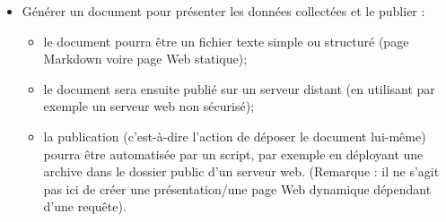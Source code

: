 {\begin{itemize}
\begin{itemize}
  \item
    extraire des statistiques (moyennes, histogrammes);
  \item
    produire des représentations ``graphiques'' (nuage de mots, tableaux
    comparatifs);
  \end{itemize}
\item
  Générer un document pour présenter les données collectées et le
  publier :
  \begin{itemize}
  \item
    le document pourra être un fichier texte simple ou structuré (page
    Markdown voire page Web statique);
  \item
    le document sera ensuite publié sur un serveur distant (en utilisant
    par exemple un serveur web non
    sécurisé);
  \item
    la publication (c'est-à-dire l'action de déposer le document
    lui-même) pourra être automatisée par
    un script, par exemple en déployant une archive dans le dossier
    public d'un serveur web. (Remarque :
    il ne s'agit pas ici de créer une présentation/une page Web
    dynamique dépendant d'une requête).
  \end{itemize}
\end{itemize}
}




